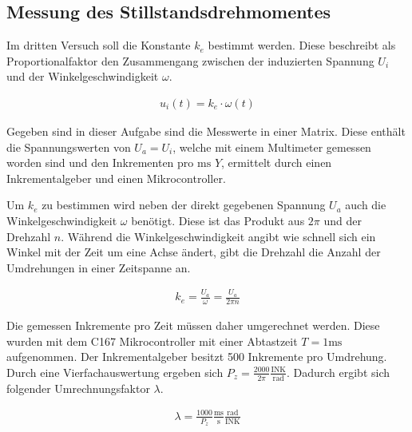 \subsection{Messung des Stillstandsdrehmomentes}

Im dritten Versuch soll die Konstante $k_e$ bestimmt werden. Diese
beschreibt als Proportionalfaktor den Zusammengang zwischen der
induzierten Spannung $U_i$ und der Winkelgeschwindigkeit $\omega$.

\begin{equation} \label{eq131}
    \begin{split}
        u_i(t)=k_e \cdot \omega (t)
    \end{split}
\end{equation}

Gegeben sind in dieser Aufgabe sind die Messwerte in einer Matrix. Diese
enthält die Spannungswerten von $U_a=U_i$, welche mit einem Multimeter
gemessen worden sind und den Inkrementen pro $\mathrm{ms}$ $Y$, ermittelt
durch einen Inkrementalgeber und einen Mikrocontroller.

Um $k_e$ zu bestimmen wird neben der direkt gegebenen Spannung $U_a$ auch
die Winkelgeschwindigkeit $\omega$ benötigt. Diese ist das Produkt aus
$2\pi$ und der Drehzahl $n$. Während die Winkelgeschwindigkeit angibt wie
schnell sich ein Winkel mit der Zeit um eine Achse ändert, gibt die Drehzahl
die Anzahl der Umdrehungen in einer Zeitspanne an.

\begin{equation} \label{eq132}
    \begin{split}
        k_e = \frac{U_a}{\omega}= \frac{U_a}{2 \pi n}
    \end{split}
\end{equation}

Die gemessen Inkremente pro Zeit müssen daher umgerechnet werden. Diese
wurden mit dem C167 Mikrocontroller mit einer Abtastzeit $T=1\mathrm{ms}$
aufgenommen. Der Inkrementalgeber besitzt 500 Inkremente pro Umdrehung.
Durch eine Vierfachauswertung ergeben sich $P_z=\frac{2000}{2\pi} \mathrm{\frac{INK}{rad}}$.
Dadurch ergibt sich folgender Umrechnungsfaktor $\lambda$.

\begin{equation} \label{eq133}
    \begin{split}
        \lambda = \frac{1000}{P_z} \mathrm{\frac{ms}{s} \frac{rad}{INK}}
    \end{split}
\end{equation}

